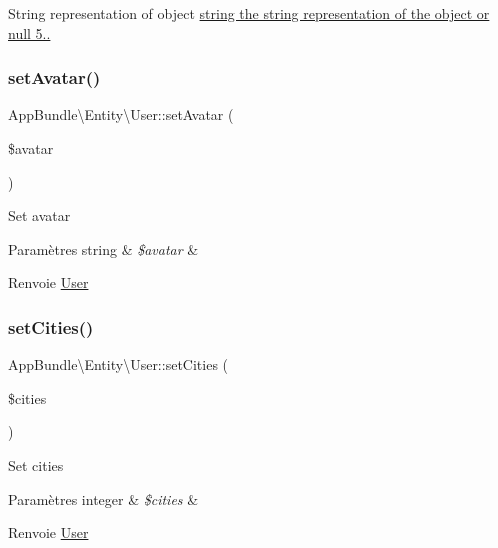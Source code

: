 String representation of object \hyperlink{}{string the string representation of the object or null  5.. }\mbox{\label{classAppBundle_1_1Entity_1_1User_acf0e0a3188e796f7a9bc40a66b1cca12}} 
\subsubsection{\texorpdfstring{set\+Avatar()}{setAvatar()}}
{\footnotesize\ttfamily App\+Bundle\textbackslash{}\+Entity\textbackslash{}\+User\+::set\+Avatar (\begin{DoxyParamCaption}\item[{}]{\$avatar }\end{DoxyParamCaption})}

Set avatar


\begin{DoxyParams}[1]{Paramètres}
string & {\em \$avatar} & \\
\hline
\end{DoxyParams}
\begin{DoxyReturn}{Renvoie}
\hyperlink{classAppBundle_1_1Entity_1_1User}{User} 
\end{DoxyReturn}
\mbox{\label{classAppBundle_1_1Entity_1_1User_af69ae82da33c9232d1eca16653076ac3}} 
\subsubsection{\texorpdfstring{set\+Cities()}{setCities()}}
{\footnotesize\ttfamily App\+Bundle\textbackslash{}\+Entity\textbackslash{}\+User\+::set\+Cities (\begin{DoxyParamCaption}\item[{}]{\$cities }\end{DoxyParamCaption})}

Set cities


\begin{DoxyParams}[1]{Paramètres}
integer & {\em \$cities} & \\
\hline
\end{DoxyParams}
\begin{DoxyReturn}{Renvoie}
\hyperlink{classAppBundle_1_1Entity_1_1User}{User} 
\end{DoxyReturn}
\mbox{\label{classAppBundle_1_1Entity_1_1User_ac87d00e19c676f595d46bf4b0e203595}} 
